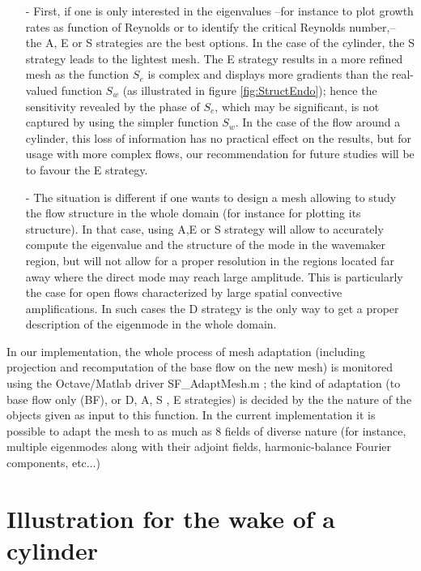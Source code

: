\documentclass[twocolumn,10pt]{asme2ej}
\begin{document}
\begin{itemize}
\item[-] 
First, if one is only interested in the eigenvalues --for instance to plot growth rates as function of Reynolds or to identify the critical Reynolds number,-- the A, E or S strategies are the best options. In the case of the cylinder, the S strategy leads to the lightest mesh. The E strategy results in a more refined mesh as the function $S_e$ is complex and displays more gradients than the real-valued function $S_w$ (as illustrated in figure \ref{fig:StructEndo}); hence the sensitivity revealed by the phase of $S_e$, which may be significant, is not captured by using the simpler function $S_w$. In the case of the flow around a cylinder,  this loss of information has no practical effect on the results, but for usage with more complex flows, our recommendation for future studies will be to favour the E strategy.
\item[-] 
The situation is different if one wants to design a mesh allowing to study the flow structure in the whole domain (for instance for plotting its structure). In that case, using A,E or S strategy will allow to accurately compute the eigenvalue and the structure of the mode in the wavemaker region, but will not allow for a proper resolution in the regions located far away where the direct mode may reach large amplitude. This is particularly the case for open flows characterized by large spatial convective amplifications. In such cases the D strategy is the only way to get a proper description of the eigenmode in the whole domain.
\end{itemize}

In our implementation, the whole process of mesh adaptation (including projection and recomputation of the base flow on the new mesh) is monitored using the Octave/Matlab driver {\sf  SF\_AdaptMesh.m} ; the kind of adaptation  (to base flow only (BF), or D, A, S , E strategies) is decided by the the nature of the objects given as input to this function. In the current implementation it is possible to adapt the mesh to as much as 8 fields of diverse nature (for instance, multiple eigenmodes along with their adjoint fields, harmonic-balance Fourier components, etc...)


\section{Illustration for the wake of a cylinder} 
\vspace{.2cm}
\end{document}
